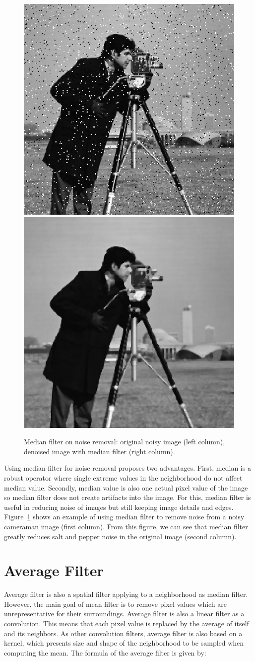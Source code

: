 \begin{figure}[!ht]		
	\centering
	\includegraphics[width=0.4\columnwidth]{images/salt_pepper_noise.jpg}
	\includegraphics[width=0.4\columnwidth]{images/salt_pepper_median.jpg}
	\caption{Median filter on noise removal: original noisy image (left column), denoised image with median filter (right column).}
	\label{fig:median}
\end{figure}	


Using median filter for noise removal proposes two advantages. First, median is a robust operator where single extreme values in the neighborhood do not affect median value. Secondly, median value is also one actual pixel value of the image so median filter does not create artifacts into the image. For this, median filter is useful in reducing noise of images but still keeping image details and edges. Figure~\ref{fig:median} shows an example of using median filter to remove noise from a noisy cameraman image (first column). From this figure, we can see that median filter greatly reduces salt and pepper noise in the original image (second column).

\section{Average Filter}

Average filter is also a spatial filter applying to a neighborhood as median filter.  However, the main goal of mean filter is to remove pixel values which are unrepresentative for their surroundings. Average filter is also a linear filter as a convolution. This means that each pixel value is replaced by the average of itself and its neighbors. As other convolution filters, average filter is also based on a kernel, which presents size and shape of the neighborhood to be sampled when computing the mean. The formula of the average filter is given by:

